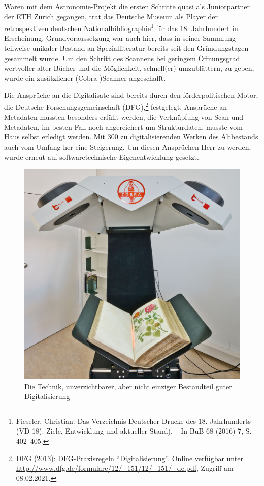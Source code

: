 \documentclass[a4paper,
fontsize=11pt,
oneside,
numbers=noperiodatend,
parskip=half-,
bibliography=totoc,
final
]{scrartcl}
\begin{document}
Waren mit dem Astronomie-Projekt die ersten Schritte quasi als
Juniorpartner der ETH Zürich gegangen, trat das Deutsche Museum als
Player der retrospektiven deutschen Nationalbibliographie\footnote{Fieseler,
  Christian: Das Verzeichnis Deutscher Drucke des 18. Jahrhunderts (VD
  18): Ziele, Entwicklung und aktueller Stand). -- In BuB 68 (2016) 7,
  S. 402--405.} für das 18. Jahrhundert in Erscheinung.
Grundvoraussetzung war auch hier, dass in seiner Sammlung teilweise
unikaler Bestand an Spezialliteratur bereits seit den Gründungstagen
gesammelt wurde. Um den Schritt des Scannens bei geringem Öffnungsgrad
wertvoller alter Bücher und die Möglichkeit, schnell(er) umzublättern,
zu geben, wurde ein zusätzlicher (Cobra-)Scanner angeschafft.

Die Ansprüche an die Digitalisate sind bereits durch den
förderpolitischen Motor, die Deutsche Forschungsgemeinschaft
(DFG),\footnote{DFG (2013): DFG-Praxisregeln \enquote{Digitalisierung}.
  Online verfügbar unter
  \url{http://www.dfg.de/formulare/12/_151/12/_151/_de.pdf}, Zugriff am
  08.02.2021.} festgelegt. Ansprüche an Metadaten mussten besonders
erfüllt werden, die Verknüpfung von Scan und Metadaten, im besten Fall
noch angereichert um Strukturdaten, musste vom Haus selbst erledigt
werden. Mit 300 zu digitalisierenden Werken des Altbestands auch vom
Umfang her eine Steigerung. Um diesen Ansprüchen Herr zu werden, wurde
erneut auf softwaretechnische Eigenentwicklung gesetzt.

\begin{figure}
\centering
\includegraphics[width=.70\textwidth]{img/Abb5.jpg}
\caption{Die Technik, unverzichtbarer, aber nicht einziger Bestandteil
guter Digitalisierung}
\end{figure}
\end{document}
